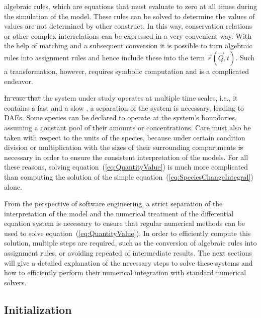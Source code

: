 \documentclass[10pt]{bmc_article}
\newenvironment{bmcformat}{\begin{raggedright}\baselineskip20pt\sloppy\setboolean{publ}{false}}{\end{raggedright}\baselineskip20pt\sloppy}
\begin{document}
\begin{bmcformat}
 algebraic rules, which are equations that
must evaluate to zero at all times during the simulation of the model.
These rules can be solved to determine the values of  values
are not determined by  other construct.
In this way, conservation relations or other complex interrelations can be
expressed in a very convenient way.
With the help of  matching \cite{hopcroft1973n} and a subsequent
conversion it is possible to turn algebraic rules into assignment rules and
hence include these into the term $\vec{r}(\vec{Q}, t)$.
Such a transformation, however, requires symbolic computation and is
 a complicated endeavor.

\sout{In case that} the system under study operates at multiple time
scales, i.e., it contains a fast and a slow , a separation of the
system is necessary, leading to \acfp{DAE}.
Some species can be declared to operate at the system's boundaries, assuming a
constant pool of their amounts or concentrations.
Care must also be taken with respect to the units of the species, because under
certain condition division or multiplication with the sizes of their surrounding
compartments \sout{is} necessary in order to ensure the consistent interpretation of
the models. 
For all these reasons, solving equation~(\ref{eq:QuantityValue}) is much more 
complicated than computing the solution of the simple equation~(\ref{eq:SpeciesChangeIntegral})
alone.

From the perspective of software engineering, a strict separation of the 
interpretation of the model and the numerical treatment of the differential
equation system is necessary to ensure that regular numerical methods can be used
to solve equation~(\ref{eq:QuantityValue}).
In order to efficiently compute this solution, multiple  steps are
required, such as the conversion of algebraic rules into assignment rules, or
avoiding repeated  of intermediate results.
The next sections will give a detailed explanation of the necessary steps to
solve these systems and how to efficiently perform their numerical integration
with standard numerical solvers.


\subsection*{Initialization}


\end{bmcformat}
\end{document}
